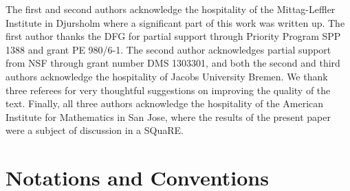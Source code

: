\documentclass{tglat2e}
\theoremstyle{definition}
\theoremstyle{remark}
\begin{document}


\bigskip

  The first and second authors
acknowledge  the hospitality of the Mittag-Leffler Institute in
Djursholm where a significant part of this work was written up.  The
first author thanks the DFG for partial support through Priority
Program SPP 1388 and grant PE 980/6-1.  The second author acknowledges
partial support from NSF through grant number DMS 1303301, and both
the second and third authors acknowledge the hospitality of Jacobs
University Bremen.  We thank three referees for very thoughtful
suggestions on improving the quality of the text.  Finally, all three
authors acknowledge the hospitality of the American Institute for
Mathematics in San Jose, where the results of the present paper were a
subject of discussion in a SQuaRE.  

\section {Notations and Conventions}
\label{sec:conv}
\end{document}
